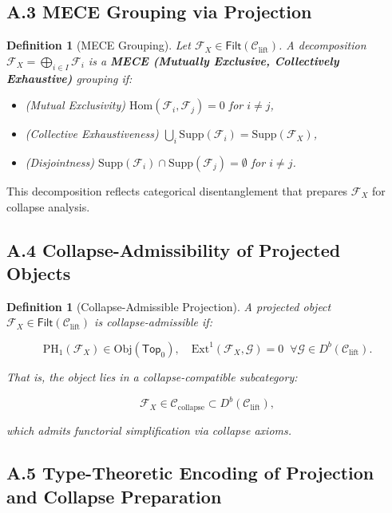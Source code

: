 \documentclass[11pt]{article}
\newtheorem{definition}[theorem]{Definition}
\begin{document}
\subsection*{A.3 MECE Grouping via Projection}

\begin{definition}[MECE Grouping]
Let \( \mathcal{F}_X \in \mathsf{Filt}(\mathcal{C}_{\mathrm{lift}}) \).  
A decomposition \( \mathcal{F}_X = \bigoplus_{i \in I} \mathcal{F}_i \) is a \textbf{MECE (Mutually Exclusive, Collectively Exhaustive)} grouping if:

\begin{itemize}
  \item (Mutual Exclusivity) \( \mathrm{Hom}(\mathcal{F}_i, \mathcal{F}_j) = 0 \) for \( i \neq j \),
  \item (Collective Exhaustiveness) \( \bigcup_{i} \mathrm{Supp}(\mathcal{F}_i) = \mathrm{Supp}(\mathcal{F}_X) \),
  \item (Disjointness) \( \mathrm{Supp}(\mathcal{F}_i) \cap \mathrm{Supp}(\mathcal{F}_j) = \emptyset \) for \( i \neq j \).
\end{itemize}
\end{definition}

This decomposition reflects categorical disentanglement that prepares \( \mathcal{F}_X \) for collapse analysis.

\subsection*{A.4 Collapse-Admissibility of Projected Objects}

\begin{definition}[Collapse-Admissible Projection]
A projected object \( \mathcal{F}_X \in \mathsf{Filt}(\mathcal{C}_{\mathrm{lift}}) \) is \emph{collapse-admissible} if:

\[
\mathrm{PH}_1(\mathcal{F}_X) \in \mathrm{Obj}(\mathsf{Top}_0), \quad
\mathrm{Ext}^1(\mathcal{F}_X, \mathcal{G}) = 0 \;\; \forall \mathcal{G} \in D^b(\mathcal{C}_{\mathrm{lift}}).
\]

That is, the object lies in a collapse-compatible subcategory:

\[
\mathcal{F}_X \in \mathcal{C}_{\mathrm{collapse}} \subset D^b(\mathcal{C}_{\mathrm{lift}}),
\]

which admits functorial simplification via collapse axioms.
\end{definition}

\subsection*{A.5 Type-Theoretic Encoding of Projection and Collapse Preparation}
\end{document}
